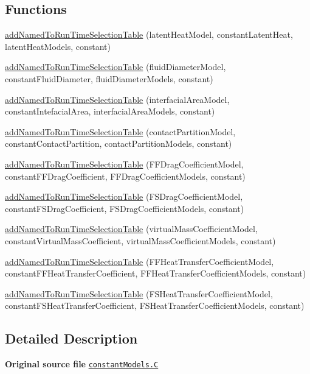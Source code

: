 \subsection*{Functions}
\begin{DoxyCompactItemize}
\item 
\hyperlink{namespaceFoam_a5718ea45487a7ca0bfcd1e1cb265ec33}{add\+Named\+To\+Run\+Time\+Selection\+Table} (latent\+Heat\+Model, constant\+Latent\+Heat, latent\+Heat\+Models, constant)
\item 
\hyperlink{namespaceFoam_a124e5735d2ec5c9c89a0ff517365d6b7}{add\+Named\+To\+Run\+Time\+Selection\+Table} (fluid\+Diameter\+Model, constant\+Fluid\+Diameter, fluid\+Diameter\+Models, constant)
\item 
\hyperlink{namespaceFoam_a0f804916ef1e60488fc86cdd534c4364}{add\+Named\+To\+Run\+Time\+Selection\+Table} (interfacial\+Area\+Model, constant\+Intefacial\+Area, interfacial\+Area\+Models, constant)
\item 
\hyperlink{namespaceFoam_ab239e2737945a4d2ca96aebd29c17ec8}{add\+Named\+To\+Run\+Time\+Selection\+Table} (contact\+Partition\+Model, constant\+Contact\+Partition, contact\+Partition\+Models, constant)
\item 
\hyperlink{namespaceFoam_a8d7730aa60088cc41aa0760ac5d05179}{add\+Named\+To\+Run\+Time\+Selection\+Table} (F\+F\+Drag\+Coefficient\+Model, constant\+F\+F\+Drag\+Coefficient, F\+F\+Drag\+Coefficient\+Models, constant)
\item 
\hyperlink{namespaceFoam_a1a65520640158e3b7680e461eddd7f4a}{add\+Named\+To\+Run\+Time\+Selection\+Table} (F\+S\+Drag\+Coefficient\+Model, constant\+F\+S\+Drag\+Coefficient, F\+S\+Drag\+Coefficient\+Models, constant)
\item 
\hyperlink{namespaceFoam_a28207b73a6e7d8a6ae42220404fa6ed0}{add\+Named\+To\+Run\+Time\+Selection\+Table} (virtual\+Mass\+Coefficient\+Model, constant\+Virtual\+Mass\+Coefficient, virtual\+Mass\+Coefficient\+Models, constant)
\item 
\hyperlink{namespaceFoam_a3198b8f706d7cc200c601425a0f8c79a}{add\+Named\+To\+Run\+Time\+Selection\+Table} (F\+F\+Heat\+Transfer\+Coefficient\+Model, constant\+F\+F\+Heat\+Transfer\+Coefficient, F\+F\+Heat\+Transfer\+Coefficient\+Models, constant)
\item 
\hyperlink{namespaceFoam_a84d7b7dae4ca14dd2ac0f6db58cf13a0}{add\+Named\+To\+Run\+Time\+Selection\+Table} (F\+S\+Heat\+Transfer\+Coefficient\+Model, constant\+F\+S\+Heat\+Transfer\+Coefficient, F\+S\+Heat\+Transfer\+Coefficient\+Models, constant)
\end{DoxyCompactItemize}


\subsection{Detailed Description}
{\bfseries Original source file} \href{../../../home/carlo/data/GeN-Foam/GeN-Foam_ffn/GeN-Foam/GeN-Foam/classes/thermalHydraulics/src/physicsModels/templatedModels/constant/constantModels.C}{\tt constant\+Models.\+C} 